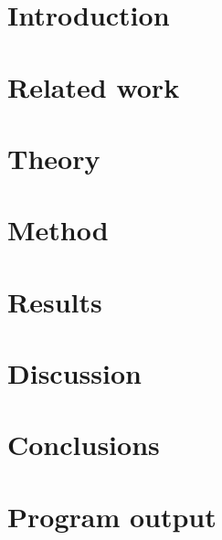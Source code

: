\documentclass[a4paper,11pt]{kth-mag}
\begin{document}
\chapter{Introduction}\label{chap:introduction}
    
\chapter{Related work}\label{chap:relatedwork}
    
\chapter{Theory}\label{chap:theory}
    
\chapter{Method}\label{chap:method}
    
\chapter{Results}\label{chap:results}
    
\chapter{Discussion}\label{chap:discussion}
    
\chapter{Conclusions}\label{chap:conclusions}
    
\nocite{*}
\printbibliography{}

\appendix
\chapter{Program output}\label{appendix:output}

\end{document}
